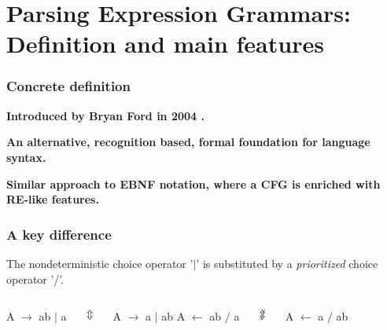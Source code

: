 \section{Parsing Expression Grammars: Definition and main features}

\begin{frame}
	\frametitle{Concrete definition}
	\textbf{Introduced by Bryan Ford in 2004 \cite{peg}.}
	
   \textbf{An alternative, recognition based, formal foundation for language syntax.}
   
   \textbf{Similar approach to EBNF notation, where a CFG is enriched with RE-like  features.}
   
\end{frame}

\begin{frame}
	\frametitle{A key difference}
	\begin{minipage}{\textwidth}
		The nondeterministic choice operator  '$|$' is substituted by a \emph{prioritized} choice operator '/'. 
	\end{minipage}
\vfill
	\begin{minipage}{\textwidth}
	\begin{columns}
		\centering
		A  $\rightarrow$ ab $|$ a 
		
		$\Updownarrow$
		
		A $\rightarrow$ a $|$ ab
		\centering
		A  $\leftarrow$ ab $/$ a 
		
		$\not\Updownarrow$
		
		A $\leftarrow$ a $/$ ab
		
	\end{columns}
			

	\end{minipage}
\end{frame}

